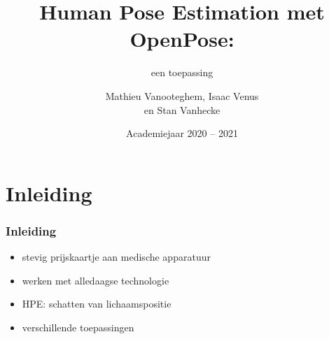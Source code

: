 \documentclass
   [kulak] %
   {kulakbeamer}
\title[HPE]{Human Pose Estimation met OpenPose:}
\subtitle{een toepassing}
\author[Korte naam]{Mathieu Vanooteghem, Isaac Venus \\ 
	en Stan Vanhecke}
\institute[Kulak]{KU Leuven Kulak}
\date{Academiejaar 2020 -- 2021}
\begin{document}
\begin{titleframe}
\titlepage
\end{titleframe}

\begin{outlineframe}[Overzicht]
\tableofcontents
\end{outlineframe}


\section{Inleiding}

\begin{frame}
\frametitle{Inleiding}
	\begin{itemize}
		\item stevig prijskaartje aan medische apparatuur
		\item werken met alledaagse technologie
		\item HPE: schatten van lichaamspositie
		\item verschillende toepassingen
	\end{itemize}
\end{frame}
\end{document}
